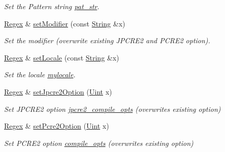\begin{DoxyCompactItemize}
\begin{DoxyCompactList}\small\item\em Set the Pattern string \hyperlink{classjpcre2_1_1Regex_a0bceb85b6dbba355b56b5cc312214435}{pat\+\_\+str}. \end{DoxyCompactList}\item 
\hyperlink{classjpcre2_1_1Regex}{Regex} \& \hyperlink{classjpcre2_1_1Regex_aed9865b58c60945e19f36fa310f5a595_aed9865b58c60945e19f36fa310f5a595}{set\+Modifier} (const \hyperlink{namespacejpcre2_a91f03070152fb228bc116c5a737f1d16}{String} \&x)
\begin{DoxyCompactList}\small\item\em Set the modifier (overwrite existing J\+P\+C\+R\+E2 and P\+C\+R\+E2 option). \end{DoxyCompactList}\item 
\hyperlink{classjpcre2_1_1Regex}{Regex} \& \hyperlink{classjpcre2_1_1Regex_a56721534519e5cb436337043eee8f42d_a56721534519e5cb436337043eee8f42d}{set\+Locale} (const \hyperlink{namespacejpcre2_a91f03070152fb228bc116c5a737f1d16}{String} \&x)
\begin{DoxyCompactList}\small\item\em Set the locale \hyperlink{classjpcre2_1_1Regex_a92a3ad992cade62d103248302f7e2f2d}{mylocale}. \end{DoxyCompactList}\item 
\hyperlink{classjpcre2_1_1Regex}{Regex} \& \hyperlink{classjpcre2_1_1Regex_a031617a19638ef752dcd2b29fa3464d5_a031617a19638ef752dcd2b29fa3464d5}{set\+Jpcre2\+Option} (\hyperlink{namespacejpcre2_a078242d38221a13fb3543b9edd78c099}{Uint} x)
\begin{DoxyCompactList}\small\item\em Set J\+P\+C\+R\+E2 option \hyperlink{classjpcre2_1_1Regex_abdd26c3bc1c3132f0aa73dde1690a7ef}{jpcre2\+\_\+compile\+\_\+opts} (overwrites existing option) \end{DoxyCompactList}\item 
\hyperlink{classjpcre2_1_1Regex}{Regex} \& \hyperlink{classjpcre2_1_1Regex_acdc6f97f4030ae109c4e1a4e2310bceb_acdc6f97f4030ae109c4e1a4e2310bceb}{set\+Pcre2\+Option} (\hyperlink{namespacejpcre2_a078242d38221a13fb3543b9edd78c099}{Uint} x)
\begin{DoxyCompactList}\small\item\em Set P\+C\+R\+E2 option \hyperlink{classjpcre2_1_1Regex_a5954131e9085de63229ed5c11417df69}{compile\+\_\+opts} (overwrites existing option) \end{DoxyCompactList}\item 

\end{DoxyCompactItemize}
